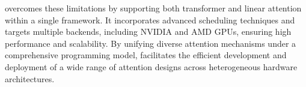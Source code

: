 
\oursys{} overcomes these limitations by supporting both transformer and linear attention within a single framework. It incorporates advanced scheduling techniques and targets multiple backends, including NVIDIA and AMD GPUs, ensuring high performance and scalability. By unifying diverse attention mechanisms under a comprehensive programming model, \oursys{} facilitates the efficient development and deployment of a wide range of attention designs across heterogeneous hardware architectures.


